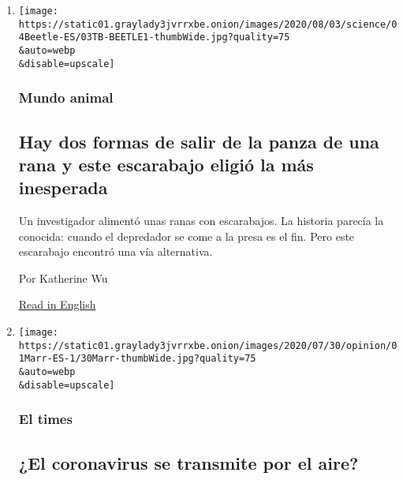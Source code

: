 \begin{enumerate}
\def\labelenumi{\arabic{enumi}.}
\item
  \href{/es/2020/08/04/espanol/ciencia-y-tecnologia/escarabajo-excremento-rana.html}{}

  \texttt{[image: https://static01.graylady3jvrrxbe.onion/images/2020/08/03/science/04Beetle-ES/03TB-BEETLE1-thumbWide.jpg?quality=75\\\&auto=webp\\\&disable=upscale]}

  \hypertarget{mundo-animal}{%
  \subsubsection{Mundo animal}\label{mundo-animal}}

  \hypertarget{hay-dos-formas-de-salir-de-la-panza-de-una-rana-y-este-escarabajo-eligiuxf3-la-muxe1s-inesperada}{%
  \subsection{Hay dos formas de salir de la panza de una rana y este
  escarabajo eligió la más
  inesperada}\label{hay-dos-formas-de-salir-de-la-panza-de-una-rana-y-este-escarabajo-eligiuxf3-la-muxe1s-inesperada}}

  Un investigador alimentó unas ranas con escarabajos. La historia
  parecía la conocida: cuando el depredador se come a la presa es el
  fin. Pero este escarabajo encontró una vía alternativa.

  Por Katherine Wu

  \href{https://www.nytimes3xbfgragh.onion/2020/08/03/science/beetle-frog-poop.html}{Read
  in English}
\item
  \href{/es/2020/08/04/espanol/coronavirus-bolsonaro-facebook.html}{}

  \texttt{[image: https://static01.graylady3jvrrxbe.onion/images/2020/07/30/opinion/01Marr-ES-1/30Marr-thumbWide.jpg?quality=75\\\&auto=webp\\\&disable=upscale]}

  \hypertarget{el-times}{%
  \subsubsection{El times}\label{el-times}}

  \hypertarget{el-coronavirus-se-transmite-por-el-aire}{%
  \subsection{¿El coronavirus se transmite por el
  aire?}\label{el-coronavirus-se-transmite-por-el-aire}}


\end{enumerate}
